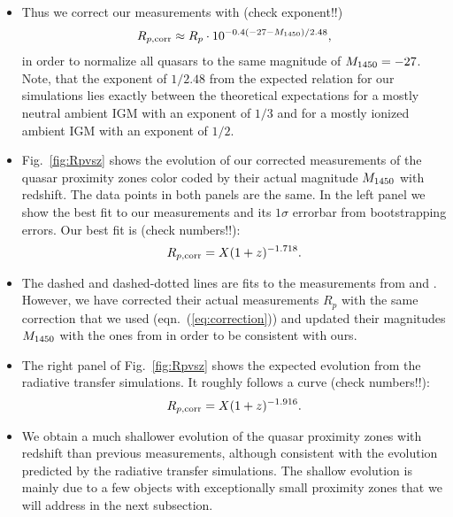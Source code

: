 \documentclass[iop]{emulateapj}
\begin{document}
\begin{itemize}
\item Thus we correct our measurements with (check exponent!!)
\begin{align}
R_{p, \rm corr} \approx R_p\cdot 10^{-0.4(-27-M_{\rm 1450})/2.48}, \label{eq:correction} 
\end{align}
in order to normalize all quasars to the same magnitude of $M_{\rm 1450}=-27$. Note, that the exponent of $1/2.48$ from the expected relation for our simulations lies exactly between the theoretical expectations for a mostly neutral ambient IGM with an exponent of $1/3$ and for a mostly ionized ambient IGM with an exponent of $1/2$. 
\item Fig.~\ref{fig:Rpvsz} shows the evolution of our corrected measurements of the quasar proximity zones color coded by their actual magnitude $M_{\rm 1450}$ with redshift. The data points in both panels are the same. In the left panel we show the best fit to our measurements and its $1\sigma$ errorbar from bootstrapping errors. Our best fit is (check numbers!!):
\begin{align*}
R_{p, \rm corr} = X (1+z)^{-1.718}. 
\end{align*}
\item The dashed and dashed-dotted lines are fits to the measurements from \citet{Carilli2010} and \citet{Venemans2015}. However, we have corrected their actual measurements $R_p$ with the same correction that we used (eqn.~(\ref{eq:correction})) and updated their magnitudes $M_{\rm 1450}$ with the ones from \citet{Banados2016} in order to be consistent with ours. 
\item The right panel of Fig.~\ref{fig:Rpvsz} shows the expected evolution from the radiative transfer simulations. It roughly follows a curve (check numbers!!):
\begin{align*}
R_{p, \rm corr} = X (1+z)^{-1.916}. 
\end{align*}
\item We obtain a much shallower evolution of the quasar proximity zones with redshift than previous measurements, although consistent with the evolution predicted by the radiative transfer simulations. The shallow evolution is mainly due to a few objects with exceptionally small proximity zones that we will address in the next subsection. 
\end{itemize}
\end{document}

